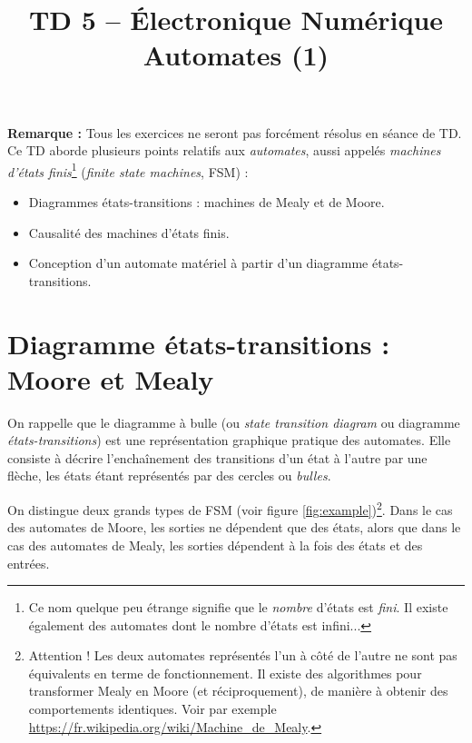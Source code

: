 \documentclass[a4paper,11pt]{article}
\title{\textcolor{primary}{\Huge\bfseries TD 5 -- Électronique Numérique}\\[0.5em] \Large Automates (1)}
\author{}
\date{}
\begin{document}
\maketitle
\vspace{-2em}

\begin{notebox}
\textbf{Remarque :} Tous les exercices ne seront pas forcément résolus en séance de TD.\\
Ce TD aborde plusieurs points relatifs aux \textit{automates}, aussi appelés \textit{machines d'états finis}\footnote{Ce nom quelque peu étrange signifie que le \textit{nombre} d'états est \textit{fini}. Il existe également des automates dont le nombre d'états est infini...} (\textit{finite state machines}, FSM) :
\begin{itemize}
    \item Diagrammes états-transitions : machines de Mealy et de Moore.
    \item Causalité des machines d'états finis.
    \item Conception d'un automate matériel à partir d'un diagramme états-transitions.
\end{itemize}
\end{notebox}

\vspace{1em}

\section{Diagramme états-transitions : Moore et Mealy}

On rappelle que le diagramme à bulle (ou \textit{state transition diagram} ou diagramme \textit{états-transitions}) est une représentation graphique pratique des automates. Elle consiste à décrire l'enchaînement des transitions d'un état à l'autre par une flèche, les états étant représentés par des cercles ou \textit{bulles}.

On distingue deux grands types de FSM (voir figure \ref{fig:example})\footnote{Attention ! Les deux automates représentés l'un à côté de l'autre ne sont pas équivalents en terme de fonctionnement. Il existe des algorithmes pour transformer Mealy en Moore (et réciproquement), de manière à obtenir des comportements identiques. Voir par exemple \url{https://fr.wikipedia.org/wiki/Machine_de_Mealy}.}. Dans le cas des automates de Moore, les sorties ne dépendent que des états, alors que dans le cas des automates de Mealy, les sorties dépendent à la fois des états et des entrées.
\end{document}
